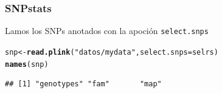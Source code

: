 \documentclass{beamer}\usepackage[]{graphicx}\usepackage[]{color}
\makeatletter
\newcommand{\hlstr}[1]{\textcolor[rgb]{0.192,0.494,0.8}{#1}}%
\newcommand{\hlstd}[1]{\textcolor[rgb]{0.345,0.345,0.345}{#1}}%
\newcommand{\hlkwb}[1]{\textcolor[rgb]{0.69,0.353,0.396}{#1}}%
\newcommand{\hlkwc}[1]{\textcolor[rgb]{0.333,0.667,0.333}{#1}}%
\newcommand{\hlkwd}[1]{\textcolor[rgb]{0.737,0.353,0.396}{\textbf{#1}}}%
\newenvironment{kframe}{%
 \def\at@end@of@kframe{}%
 \ifinner\ifhmode%
  \def\at@end@of@kframe{\end{minipage}}%
  \begin{minipage}{\columnwidth}%
 \fi\fi%
 \def\FrameCommand##1{\hskip\@totalleftmargin \hskip-\fboxsep
 \colorbox{shadecolor}{##1}\hskip-\fboxsep
     \hskip-\linewidth \hskip-\@totalleftmargin \hskip\columnwidth}%
 \MakeFramed {\advance\hsize-\width
   \@totalleftmargin\z@ \linewidth\hsize
   \@setminipage}}%
 {\par\unskip\endMakeFramed%
 \at@end@of@kframe}
\newenvironment{knitrout}{}{} %
\makeatother
\begin{document}
\begin{frame}[fragile]
\frametitle{SNPstats}
Lamos los SNPs anotados con la apoci\'on {\tt select.snps}
\begin{knitrout}\footnotesize
{}\color{fgcolor}\begin{kframe}
\begin{alltt}
\hlstd{snp}\hlkwb{<-}\hlkwd{read.plink}\hlstd{(}\hlstr{"datos/mydata"}\hlstd{,} \hlkwc{select.snps} \hlstd{= selrs)}
\hlkwd{names}\hlstd{(snp)}
\end{alltt}
\begin{verbatim}
## [1] "genotypes" "fam"       "map"
\end{verbatim}
\end{kframe}
\end{knitrout}
\end{frame}
\end{document}
